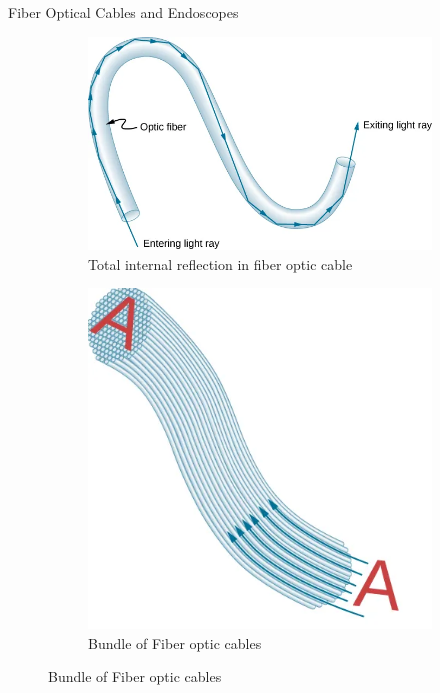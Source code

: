 \documentclass{beamer}
\begin{document}
\begin{frame}{Fiber Optical Cables and Endoscopes}
	\begin{figure}
		\centering
		\begin{subfigure}[b]{0.3\textwidth}
			\centering
			\includegraphics[width=\textwidth]{31.png}
			\caption{Total internal reflection in fiber optic cable}
			\label{Refraction}
		\end{subfigure}
		\hfill
		\begin{subfigure}[b]{0.3\textwidth}
			\centering
			\includegraphics[width=\textwidth]{32.png}
			\caption{Bundle of Fiber optic cables}

\end{subfigure}
\end{figure}
\end{frame}
\end{document}
